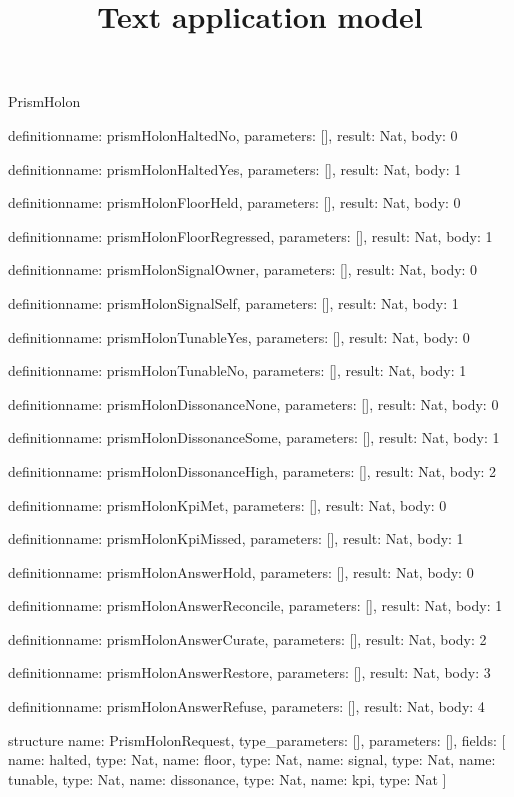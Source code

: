 \begin{lexlean}{PrismHolon}
\title{Text application model}
\begin{semanticmodule}
definition{name: prismHolonHaltedNo, parameters: [], result: Nat, body: 0}

definition{name: prismHolonHaltedYes, parameters: [], result: Nat, body: 1}

definition{name: prismHolonFloorHeld, parameters: [], result: Nat, body: 0}

definition{name: prismHolonFloorRegressed, parameters: [], result: Nat, body: 1}

definition{name: prismHolonSignalOwner, parameters: [], result: Nat, body: 0}

definition{name: prismHolonSignalSelf, parameters: [], result: Nat, body: 1}

definition{name: prismHolonTunableYes, parameters: [], result: Nat, body: 0}

definition{name: prismHolonTunableNo, parameters: [], result: Nat, body: 1}

definition{name: prismHolonDissonanceNone, parameters: [], result: Nat, body: 0}

definition{name: prismHolonDissonanceSome, parameters: [], result: Nat, body: 1}

definition{name: prismHolonDissonanceHigh, parameters: [], result: Nat, body: 2}

definition{name: prismHolonKpiMet, parameters: [], result: Nat, body: 0}

definition{name: prismHolonKpiMissed, parameters: [], result: Nat, body: 1}

definition{name: prismHolonAnswerHold, parameters: [], result: Nat, body: 0}

definition{name: prismHolonAnswerReconcile, parameters: [], result: Nat, body: 1}

definition{name: prismHolonAnswerCurate, parameters: [], result: Nat, body: 2}

definition{name: prismHolonAnswerRestore, parameters: [], result: Nat, body: 3}

definition{name: prismHolonAnswerRefuse, parameters: [], result: Nat, body: 4}

structure{
  name: PrismHolonRequest,
  type_parameters: [],
  parameters: [],
  fields: [
    {name: halted, type: Nat},
    {name: floor, type: Nat},
    {name: signal, type: Nat},
    {name: tunable, type: Nat},
    {name: dissonance, type: Nat},
    {name: kpi, type: Nat}
  ]
}


\end{semanticmodule}
\end{lexlean}
